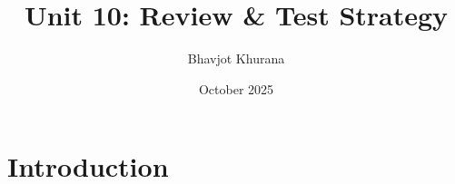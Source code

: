\documentclass{article}
\title{Unit 10: Review & Test Strategy}
\author{Bhavjot Khurana}
\date{October 2025}
\begin{document}
\maketitle

\section{Introduction}
\end{document}
